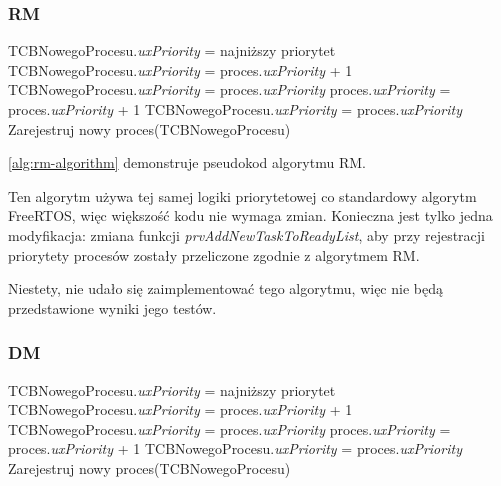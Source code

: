 \documentclass[../../main]{subfiles}
\begin{document}
\subsubsection{RM}

\begin{algorithm}
\caption{Pseudokod algorytmu RM}\label{alg:rm-algorithm}
\begin{algorithmic}[1]
    \State TCBNowegoProcesu.\textit{uxPriority} = najniższy priorytet
\Else
            \State TCBNowegoProcesu.\textit{uxPriority} = proces.\textit{uxPriority} + 1
            \State TCBNowegoProcesu.\textit{uxPriority} = proces.\textit{uxPriority}
            \State proces.\textit{uxPriority} = proces.\textit{uxPriority} + 1
        \Else
            \State TCBNowegoProcesu.\textit{uxPriority} = proces.\textit{uxPriority}
        \EndIf
    \EndFor
\EndIf
\State Zarejestruj nowy proces(TCBNowegoProcesu)
\end{algorithmic}
\end{algorithm}

\cref{alg:rm-algorithm} demonstruje pseudokod algorytmu RM.

Ten algorytm używa tej samej logiki priorytetowej co standardowy algorytm FreeRTOS, więc większość kodu nie wymaga zmian. Konieczna jest tylko jedna modyfikacja: zmiana funkcji \textit{prvAddNewTaskToReadyList}, aby przy rejestracji priorytety procesów zostały przeliczone zgodnie z algorytmem RM.

Niestety, nie udało się zaimplementować tego algorytmu, więc nie będą przedstawione wyniki jego testów.

\subsubsection{DM}

\begin{algorithm}
\caption{Pseudokod algorytmu DM}\label{alg:dm-algorithm}
\begin{algorithmic}[1]
    \State TCBNowegoProcesu.\textit{uxPriority} = najniższy priorytet
\Else
            \State TCBNowegoProcesu.\textit{uxPriority} = proces.\textit{uxPriority} + 1
            \State TCBNowegoProcesu.\textit{uxPriority} = proces.\textit{uxPriority}
            \State proces.\textit{uxPriority} = proces.\textit{uxPriority} + 1
        \Else
            \State TCBNowegoProcesu.\textit{uxPriority} = proces.\textit{uxPriority}
        \EndIf
    \EndFor
\EndIf
\State Zarejestruj nowy proces(TCBNowegoProcesu)
\end{algorithmic}
\end{algorithm}
\end{document}

